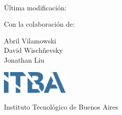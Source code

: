 
\begin{titlepage}
\thispagestyle{empty}

\begin{center}
    \vspace*{1cm}
    
    \Huge
    \textbf{\thetitle}
    
    \vspace{0.25cm}
    \large
    \codigomateria \\
    \vspace{0.25cm}
    \Large
    \cuatrimestre

    \vspace{0.25cm}
    \tiny
    Última modificación: \thedate

    
    \vspace{1.5cm}
    
    \normalsize
    \textbf{\theauthor}

    \medskip

    Con la colaboración de:

    Abril Vilamowski%
    \\%
    David Wischñevsky%
    \\%
    Jonathan Liu%
    
    \vfill
    
    \vspace{0.8cm}
    \includegraphics[width=0.25\textwidth]{itba_logo.png}
    
    \vspace{0.8cm}
    
    Instituto Tecnológico de Buenos Aires\\
    
    
\end{center}

\end{titlepage}

\restoregeometry %
